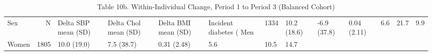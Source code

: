 \begin{table}[ht]
\centering
\caption{Table 10b. Within-Individual Change, Period 1 to Period 3 (Balanced Cohort)} 
\begin{tabular}{lrllllll}
  \toprule
Sex & N & Delta SBP mean (SD) & Delta Chol mean (SD) & Delta BMI mean (SD) & Incident diabetes (%
  \midrule
Men & 1334 & 10.2 (18.6) & -6.9 (37.8) & 0.04 (2.11) & 6.6 & 21.7 & 9.9 \\ 
  Women & 1805 & 10.0 (19.0) & 7.5 (38.7) & 0.31 (2.48) & 5.6 & 10.5 & 14.7 \\ 
   \bottomrule
\end{tabular}
\end{table}
